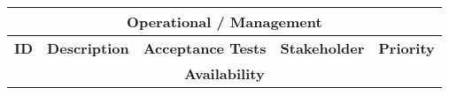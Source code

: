 \begin{table}
	\centering
	\begin{tabular}{|l|l|l|l|l|} 
		\hline
		\multicolumn{5}{c}{\textbf{Operational / Management}}                                                                                                                                                                                                                                                                                                                                                                                                                                                                                                                                                                                                                                                                                                                           \\ 
		\hline
		\textbf{ID} & \textbf{Description}                                                                                                                                                                                                                & \textbf{Acceptance Tests}                                                                                                                                                                                                                                                                                                                                                                                                        & \textbf{Stakeholder}                                                  & \textbf{Priority}  \\ 
		\hline
		\multicolumn{5}{c}{\textbf{Availability}}                                                                                                                                                                                                                                                                                                                                                                                                                                                                                                                                                                                                                                                                                                                                       \\ 
		\hline

\end{tabular}
\end{table}
